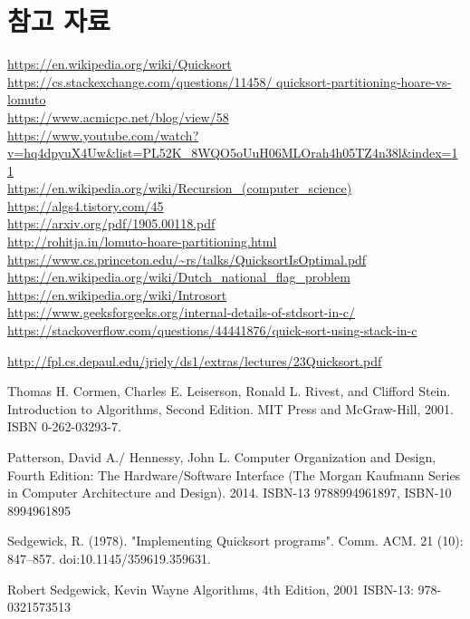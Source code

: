 
\section*{참고 자료}
\url{https://en.wikipedia.org/wiki/Quicksort} \\
\url{https://cs.stackexchange.com/questions/11458/ quicksort-partitioning-hoare-vs-lomuto} \\
\url{https://www.acmicpc.net/blog/view/58} \\
\url{https://www.youtube.com/watch?v=hq4dpyuX4Uw&list=PL52K_8WQO5oUuH06MLOrah4h05TZ4n38l&index=11} \\
\url{https://en.wikipedia.org/wiki/Recursion_(computer_science)} \\
\url{https://algs4.tistory.com/45} \\
\url{https://arxiv.org/pdf/1905.00118.pdf} \\
\url{http://rohitja.in/lomuto-hoare-partitioning.html} \\


\url{https://www.cs.princeton.edu/~rs/talks/QuicksortIsOptimal.pdf}
\url{https://en.wikipedia.org/wiki/Dutch_national_flag_problem}\\
\url{https://en.wikipedia.org/wiki/Introsort}\\
\url{https://www.geeksforgeeks.org/internal-details-of-stdsort-in-c/}
\url{https://stackoverflow.com/questions/44441876/quick-sort-using-stack-in-c}

\url{http://fpl.cs.depaul.edu/jriely/ds1/extras/lectures/23Quicksort.pdf}

\begin{thebibliography}{}
    Thomas H. Cormen, Charles E. Leiserson, Ronald L. Rivest, and Clifford Stein. Introduction to Algorithms, Second Edition. MIT Press and McGraw-Hill, 2001. ISBN 0-262-03293-7.
    
    Patterson, David A./ Hennessy, John L. Computer Organization and Design, Fourth Edition: The Hardware/Software Interface (The Morgan Kaufmann Series in Computer Architecture and Design). 2014. ISBN-13 9788994961897, ISBN-10 8994961895

    Sedgewick, R. (1978). "Implementing Quicksort programs". Comm. ACM. 21 (10): 847–857. doi:10.1145/359619.359631.

    Robert Sedgewick, Kevin Wayne Algorithms, 4th Edition, 2001 ISBN-13: 978-0321573513

\end{thebibliography}